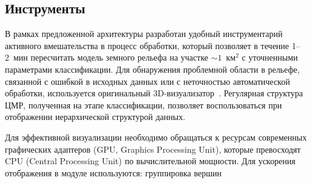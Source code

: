 \begin{multicols}{2}
\section{Инструменты}

   В рамках предложенной архитектуры разработан удобный инструментарий 
активного вмешательства в процесс обработки, который позволяет в течение 
   1--2~мин пересчитать модель земного рельефа на участке $\sim 1$~км$^2$ 
с уточненными параметрами классификации. Для обнаружения проб\-лем\-ной 
области в рельефе, связанной с ошибкой в исходных данных или с неточностью 
автоматической обработки, используется оригинальный 
   3D-визуализатор~\cite{7su}. Регулярная структура ЦМР, полученная на 
этапе классификации, позволяет воспользоваться при отображении 
иерархической структурой данных.
   
   Для эффективной визуализации необходимо обращаться к ресурсам 
современных графических адаптеров (GPU, Graphics Processing Unit), которые превосходят CPU 
(Central Processing Unit) по 
вычислительной мощности. Для ускорения отображения в модуле 
используются: группировка вершин\linebreak\vspace*{-12pt}
\pagebreak

\end{multicols}

   \begin{figure} %
   \vspace*{1pt}
\begin{center}
\vspace*{1pt}
\mbox{%
\epsfxsize=158mm %
}
\end{center}
\vspace*{-9pt}
      \vspace*{9pt}
   \end{figure}
   
